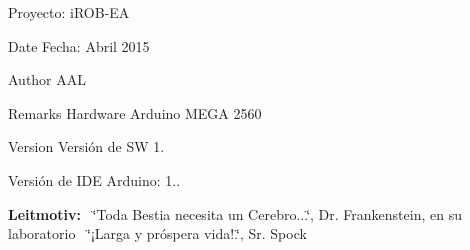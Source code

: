 Proyecto\+: i\+R\+O\+B-\/\+EA 



\begin{DoxyDate}{Date}
Fecha\+: Abril 2015 
\end{DoxyDate}
\begin{DoxyAuthor}{Author}
A\+AL
\end{DoxyAuthor}
\begin{DoxyRemark}{Remarks}
Hardware Arduino M\+E\+GA 2560~\newline
 
\end{DoxyRemark}
\begin{DoxyVersion}{Version}
Versión de SW 1. 

Versión de I\+DE Arduino\+: 1..
\end{DoxyVersion}
{\bfseries Leitmotiv\+:}~\newline
 \char`\"{}\+Toda Bestia necesita un Cerebro...\char`\"{}, Dr. Frankenstein, en su laboratorio~\newline
 \char`\"{}¡\+Larga y próspera vida!.\char`\"{}, Sr. Spock~\newline


 